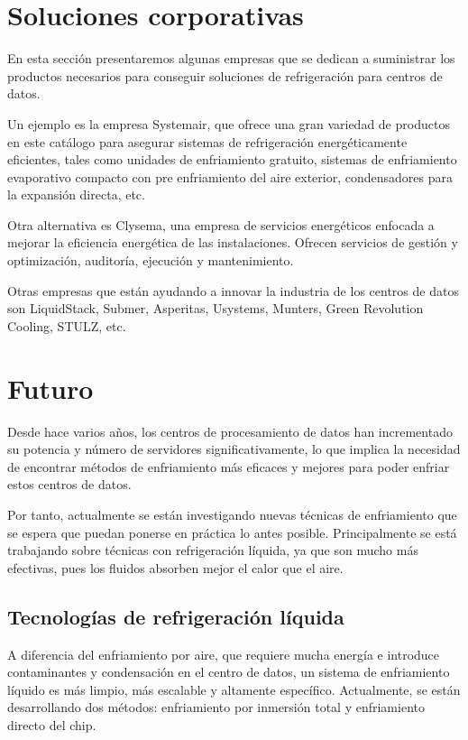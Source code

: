 \section{Soluciones corporativas}


En esta sección presentaremos algunas empresas que se dedican a suministrar los productos necesarios para conseguir soluciones de refrigeración para centros de datos.

Un ejemplo es la empresa Systemair, que ofrece una gran variedad de productos en este catálogo para asegurar sistemas de refrigeración energéticamente eficientes, tales como unidades de enfriamiento gratuito, sistemas de enfriamiento evaporativo compacto con pre enfriamiento del aire exterior, condensadores para la expansión directa, etc.

Otra alternativa es Clysema, una empresa de servicios energéticos enfocada a mejorar la eficiencia energética de las instalaciones. Ofrecen servicios de gestión y optimización, auditoría, ejecución y mantenimiento.

Otras empresas que están ayudando a innovar la industria de los centros de datos son LiquidStack, Submer, Asperitas, Usystems, Munters, Green Revolution Cooling, STULZ, etc.



\section{Futuro}

Desde hace varios años, los centros de procesamiento de datos han incrementado su potencia y número de servidores significativamente, lo que implica la necesidad de encontrar métodos de enfriamiento más eficaces y mejores para poder enfriar estos centros de datos.

Por tanto, actualmente se están investigando nuevas técnicas de enfriamiento que se espera que puedan ponerse en práctica lo antes posible. Principalmente se está trabajando sobre técnicas con refrigeración líquida, ya que son mucho más efectivas, pues los fluidos absorben mejor el calor que el aire.

\subsection{Tecnologías de refrigeración líquida}

A diferencia del enfriamiento por aire, que requiere mucha energía e introduce contaminantes y condensación en el centro de datos, un sistema de enfriamiento líquido es más limpio, más escalable y altamente específico. Actualmente, se están desarrollando dos métodos: enfriamiento por inmersión total y enfriamiento directo del chip.


